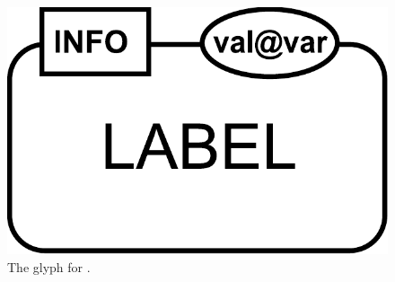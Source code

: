 \begin{figure}[H]
  \centering
  \includegraphics[scale = 0.3]{images/macromolecule}
  \caption{The \PD glyph for .}
  \label{fig:macromolecule}
\end{figure}






